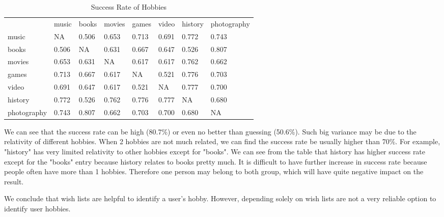 \begin{table}[!ht]
\centering
\caption{Success Rate of Hobbies}
\label{tb:hobby}
\begin{adjustbox}{max width=.5\textwidth}
\begin{tabular}{llllllll}
            & music & books & movies & games & video & history & photography \\
music       & NA    & 0.506 & 0.653  & 0.713 & 0.691 & 0.772   & 0.743       \\
books       & 0.506 & NA    & 0.631  & 0.667 & 0.647 & 0.526   & 0.807       \\
movies      & 0.653 & 0.631 & NA     & 0.617 & 0.617 & 0.762   & 0.662       \\
games       & 0.713 & 0.667 & 0.617  & NA    & 0.521 & 0.776   & 0.703       \\
video       & 0.691 & 0.647 & 0.617  & 0.521 & NA    & 0.777   & 0.700       \\
history     & 0.772 & 0.526 & 0.762  & 0.776 & 0.777 & NA      & 0.680       \\
photography & 0.743 & 0.807 & 0.662  & 0.703 & 0.700 & 0.680   & NA         
\end{tabular}
\end{adjustbox}
\end{table}

We can see that the success rate can be high (80.7\%) or even no better than guessing (50.6\%). Such big variance may be due to the relativity of different hobbies. When 2 hobbies are not much related, we can find the success rate be usually higher than 70\%. For example, "history" has very limited relativity to other hobbies except for "books". We can see from the table that history has higher success rate except for the "books" entry because history relates to books pretty much. It is difficult to have further increase in success rate because people often have more than 1 hobbies. Therefore one person may belong to both group, which will have quite negative impact on the result.

We conclude that wish lists are helpful to identify a user's hobby. However, depending solely on wish lists are not a very reliable option to identify user hobbies. 
